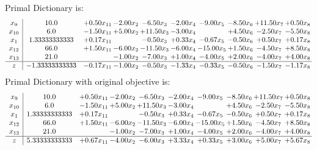 \documentclass[9pt]{article}
\begin{document}
Primal Dictionary is:
\[\begin{array}{c| c c@{\hskip 2pt} c@{\hskip 2pt} c@{\hskip 2pt} c@{\hskip 2pt} c@{\hskip 2pt} c@{\hskip 2pt} c@{\hskip 2pt} c@{\hskip 2pt} }
 x_{9}   &  10.0 & +  0.50 x_{11} & -2.00 x_{2} & -6.50 x_{3} & -2.00 x_{4} & -9.00 x_{5} & -8.50 x_{6} & + 11.50 x_{7} & +  0.50 x_{8}\\
 x_{10}   &  6.0 & -1.50 x_{11} & +  5.00 x_{2} & + 11.50 x_{3} & -3.00 x_{4} &   & +  4.50 x_{6} & -2.50 x_{7} & -5.50 x_{8}\\
 x_{1}   &  1.33333333333 & +  0.17 x_{11} &   & -0.50 x_{3} & +  0.33 x_{4} & -0.67 x_{5} & -0.50 x_{6} & +  0.50 x_{7} & +  0.17 x_{8}\\
 x_{12}   &  66.0 & +  1.50 x_{11} & -6.00 x_{2} & -11.50 x_{3} & -6.00 x_{4} & -15.00 x_{5} & +  1.50 x_{6} & -4.50 x_{7} & +  8.50 x_{8}\\
 x_{13}   &  21.0  &   & -1.00 x_{2} & -7.00 x_{3} & +  1.00 x_{4} & -4.00 x_{5} & +  2.00 x_{6} & -4.00 x_{7} & +  4.00 x_{8}\\
\hline
z    &  -1.33333333333 & -0.17 x_{11} & -1.00 x_{2} & -0.50 x_{3} & -1.33 x_{4} & -0.33 x_{5} & -0.50 x_{6} & -1.50 x_{7} & -1.17 x_{8}\\
\end{array}\]
Primal Dictionary with original objective is:
\[\begin{array}{c| c c@{\hskip 2pt} c@{\hskip 2pt} c@{\hskip 2pt} c@{\hskip 2pt} c@{\hskip 2pt} c@{\hskip 2pt} c@{\hskip 2pt} c@{\hskip 2pt} }
 x_{9}   &  10.0 & +  0.50 x_{11} & -2.00 x_{2} & -6.50 x_{3} & -2.00 x_{4} & -9.00 x_{5} & -8.50 x_{6} & + 11.50 x_{7} & +  0.50 x_{8}\\
 x_{10}   &  6.0 & -1.50 x_{11} & +  5.00 x_{2} & + 11.50 x_{3} & -3.00 x_{4} &   & +  4.50 x_{6} & -2.50 x_{7} & -5.50 x_{8}\\
 x_{1}   &  1.33333333333 & +  0.17 x_{11} &   & -0.50 x_{3} & +  0.33 x_{4} & -0.67 x_{5} & -0.50 x_{6} & +  0.50 x_{7} & +  0.17 x_{8}\\
 x_{12}   &  66.0 & +  1.50 x_{11} & -6.00 x_{2} & -11.50 x_{3} & -6.00 x_{4} & -15.00 x_{5} & +  1.50 x_{6} & -4.50 x_{7} & +  8.50 x_{8}\\
 x_{13}   &  21.0  &   & -1.00 x_{2} & -7.00 x_{3} & +  1.00 x_{4} & -4.00 x_{5} & +  2.00 x_{6} & -4.00 x_{7} & +  4.00 x_{8}\\
\hline
z    &  5.33333333333 & +  0.67 x_{11} & -4.00 x_{2} & -6.00 x_{3} & +  3.33 x_{4} & +  0.33 x_{5} & +  3.00 x_{6} & +  5.00 x_{7} & +  5.67 x_{8}\\
\end{array}\]
\end{document}
